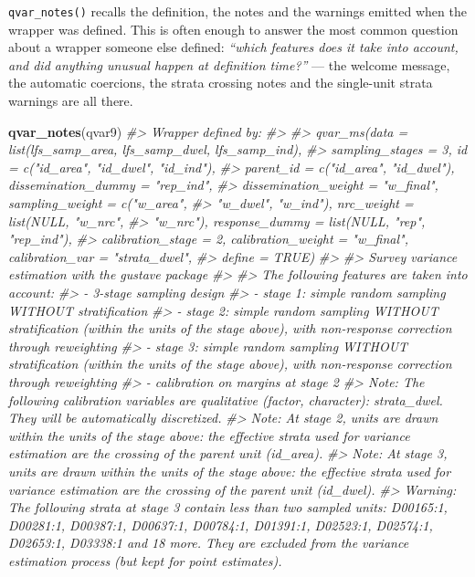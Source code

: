 \documentclass[
]{article}
\newenvironment{Shaded}{\begin{snugshade}}{\end{snugshade}}
\newcommand{\CommentTok}[1]{\textcolor[rgb]{0.56,0.35,0.01}{\textit{#1}}}
\newcommand{\FunctionTok}[1]{\textcolor[rgb]{0.13,0.29,0.53}{\textbf{#1}}}
\newcommand{\NormalTok}[1]{#1}
\begin{document}
\texttt{qvar\_notes()} recalls the definition, the notes and the
warnings emitted when the wrapper was defined. This is often enough to
answer the most common question about a wrapper someone else defined:
\emph{``which features does it take into account, and did anything
unusual happen at definition time?''} --- the welcome message, the
automatic coercions, the strata crossing notes and the single-unit
strata warnings are all there.

\begin{Shaded}
\begin{Highlighting}[]
\FunctionTok{qvar\_notes}\NormalTok{(qvar9)}
\CommentTok{\#\textgreater{} Wrapper defined by:}
\CommentTok{\#\textgreater{} }
\CommentTok{\#\textgreater{} qvar\_ms(data = list(lfs\_samp\_area, lfs\_samp\_dwel, lfs\_samp\_ind), }
\CommentTok{\#\textgreater{}     sampling\_stages = 3, id = c("id\_area", "id\_dwel", "id\_ind"), }
\CommentTok{\#\textgreater{}     parent\_id = c("id\_area", "id\_dwel"), dissemination\_dummy = "rep\_ind", }
\CommentTok{\#\textgreater{}     dissemination\_weight = "w\_final", sampling\_weight = c("w\_area", }
\CommentTok{\#\textgreater{}         "w\_dwel", "w\_ind"), nrc\_weight = list(NULL, "w\_nrc", }
\CommentTok{\#\textgreater{}         "w\_nrc"), response\_dummy = list(NULL, "rep", "rep\_ind"), }
\CommentTok{\#\textgreater{}     calibration\_stage = 2, calibration\_weight = "w\_final", calibration\_var = "strata\_dwel", }
\CommentTok{\#\textgreater{}     define = TRUE)}
\CommentTok{\#\textgreater{} }
\CommentTok{\#\textgreater{} Survey variance estimation with the gustave package}
\CommentTok{\#\textgreater{} }
\CommentTok{\#\textgreater{} The following features are taken into account:}
\CommentTok{\#\textgreater{}   {-} 3{-}stage sampling design}
\CommentTok{\#\textgreater{}   {-} stage 1: simple random sampling WITHOUT stratification}
\CommentTok{\#\textgreater{}   {-} stage 2: simple random sampling WITHOUT stratification (within the units of the stage above), with non{-}response correction through reweighting}
\CommentTok{\#\textgreater{}   {-} stage 3: simple random sampling WITHOUT stratification (within the units of the stage above), with non{-}response correction through reweighting}
\CommentTok{\#\textgreater{}   {-} calibration on margins at stage 2}
\CommentTok{\#\textgreater{} Note: The following calibration variables are qualitative (factor, character): strata\_dwel. They will be automatically discretized.}
\CommentTok{\#\textgreater{} Note: At stage 2, units are drawn within the units of the stage above: the effective strata used for variance estimation are the crossing of the parent unit (id\_area).}
\CommentTok{\#\textgreater{} Note: At stage 3, units are drawn within the units of the stage above: the effective strata used for variance estimation are the crossing of the parent unit (id\_dwel).}
\CommentTok{\#\textgreater{} Warning: The following strata at stage 3 contain less than two sampled units: D00165:1, D00281:1, D00387:1, D00637:1, D00784:1, D01391:1, D02523:1, D02574:1, D02653:1, D03338:1 and 18 more. They are excluded from the variance estimation process (but kept for point estimates).}
\end{Highlighting}
\end{Shaded}
\end{document}
